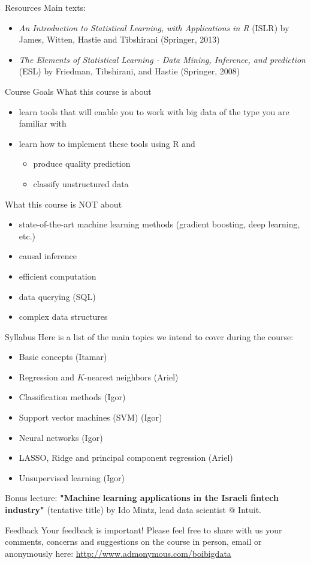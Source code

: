 \documentclass[aspectratio=169]{beamer}
\begin{document}
\begin{frame}{Resources}
Main texts:
\begin{itemize}
\item \textit{An Introduction to Statistical Learning, with Applications in R} (ISLR) by James, Witten, Hastie and Tibshirani (Springer, 2013)
\item \textit{The Elements of Statistical Learning - Data Mining, Inference, and prediction} (ESL) by Friedman, Tibshirani, and Hastie (Springer, 2008)
\end{itemize}
\end{frame}

\begin{frame}{Course Goals}
What this course is about
\begin{itemize}
\item learn tools that will enable you to work with big data of the type you are familiar with
\item learn how to implement these tools using R and
\begin{itemize}
\item produce quality prediction
\item classify unstructured data
\end{itemize}
\end{itemize}
What this course is NOT about
\begin{itemize}
\item state-of-the-art machine learning methods (gradient boosting, deep learning, etc.)
\item causal inference
\item efficient computation
\item data querying (SQL)
\item complex data structures
\end{itemize}
\end{frame}

\begin{frame}{Syllabus}
Here is a list of the main topics we intend to cover during the course:
\begin{itemize}
\item Basic concepts (Itamar)
\item Regression and $ K $-nearest neighbors (Ariel)
\item Classification methods (Igor)
\item Support vector machines (SVM) (Igor)
\item Neural networks (Igor)
\item LASSO, Ridge and principal component regression (Ariel)
\item Unsupervised learning (Igor)
\end{itemize}
Bonus lecture: \textbf{"Machine learning applications in the Israeli fintech industry"} (tentative title) by Ido Mintz, lead data scientist @ Intuit.
\end{frame}

\begin{frame}{Feedback}
Your feedback is important! Please feel free to share with us your comments, concerns and suggestions on the course in person, email or anonymously here:
\url{http://www.admonymous.com/boibigdata}
\end{frame}
\end{document}
